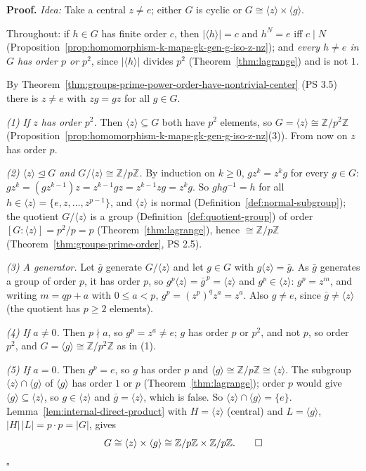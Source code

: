 \documentclass[11pt]{report}
\renewenvironment{proof}[1][Proof]{\noindent\textbf{#1.} }{\hfill$\square$\par\vspace{5pt}}
\begin{document}
\begin{proof}
\textit{Idea:} Take a central $z \neq e$; either $G$ is cyclic or $G \cong \langle z \rangle \times \langle g \rangle$.\par
Throughout: if $h \in G$ has finite order $c$, then $|\langle h \rangle| = c$ and $h^N = e$ iff $c \mid N$ (Proposition~\ref{prop:homomorphism-k-maps-gk-gen-g-iso-z-nz}); and \emph{every $h \neq e$ in $G$ has order $p$ or $p^2$}, since $|\langle h \rangle|$ divides $p^2$ (Theorem~\ref{thm:lagrange}) and is not $1$.

By Theorem~\ref{thm:groups-prime-power-order-have-nontrivial-center} (PS 3.5) there is $z \neq e$ with $zg = gz$ for all $g \in G$.

\emph{(1) If $z$ has order $p^2$.} Then $\langle z \rangle \subseteq G$ both have $p^2$ elements, so $G = \langle z \rangle \cong \mathbb{Z}/p^2\mathbb{Z}$ (Proposition~\ref{prop:homomorphism-k-maps-gk-gen-g-iso-z-nz}(3)). From now on $z$ has order $p$.

\emph{(2) $\langle z \rangle \trianglelefteq G$ and $G/\langle z \rangle \cong \mathbb{Z}/p\mathbb{Z}$.} By induction on $k \geq 0$, $gz^k = z^kg$ for every $g \in G$: $gz^k = (gz^{k-1})z = z^{k-1}gz = z^{k-1}zg = z^kg$. So $g h g^{-1} = h$ for all $h \in \langle z \rangle = \{e, z, \ldots, z^{p-1}\}$, and $\langle z \rangle$ is normal (Definition~\ref{def:normal-subgroup}); the quotient $G/\langle z \rangle$ is a group (Definition~\ref{def:quotient-group}) of order $[G : \langle z \rangle] = p^2/p = p$ (Theorem~\ref{thm:lagrange}), hence $\cong \mathbb{Z}/p\mathbb{Z}$ (Theorem~\ref{thm:groups-prime-order}, PS 2.5).

\emph{(3) A generator.} Let $\bar g$ generate $G/\langle z \rangle$ and let $g \in G$ with $g\langle z \rangle = \bar g$. As $\bar g$ generates a group of order $p$, it has order $p$, so $g^p\langle z \rangle = \bar g^{\,p} = \langle z \rangle$ and $g^p \in \langle z \rangle$: $g^p = z^m$, and writing $m = qp + a$ with $0 \leq a < p$, $g^p = (z^p)^q z^a = z^a$. Also $g \neq e$, since $\bar g \neq \langle z \rangle$ (the quotient has $p \geq 2$ elements).

\emph{(4) If $a \neq 0$.} Then $p \nmid a$, so $g^p = z^a \neq e$; $g$ has order $p$ or $p^2$, and not $p$, so order $p^2$, and $G = \langle g \rangle \cong \mathbb{Z}/p^2\mathbb{Z}$ as in (1).

\emph{(5) If $a = 0$.} Then $g^p = e$, so $g$ has order $p$ and $\langle g \rangle \cong \mathbb{Z}/p\mathbb{Z} \cong \langle z \rangle$. The subgroup $\langle z \rangle \cap \langle g \rangle$ of $\langle g \rangle$ has order $1$ or $p$ (Theorem~\ref{thm:lagrange}); order $p$ would give $\langle g \rangle \subseteq \langle z \rangle$, so $g \in \langle z \rangle$ and $\bar g = \langle z \rangle$, which is false. So $\langle z \rangle \cap \langle g \rangle = \{e\}$. Lemma~\ref{lem:internal-direct-product} with $H = \langle z \rangle$ (central) and $L = \langle g \rangle$, $|H|\,|L| = p \cdot p = |G|$, gives
\[ G \cong \langle z \rangle \times \langle g \rangle \cong \mathbb{Z}/p\mathbb{Z} \times \mathbb{Z}/p\mathbb{Z} . \qedhere \]
\end{proof}
\end{document}
